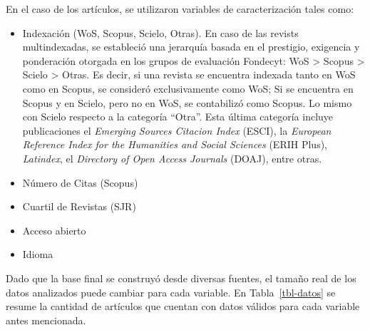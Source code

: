 \documentclass[
  a4paper,
  oneside]{scrbook}
\begin{document}
En el caso de los artículos, se utilizaron variables de caracterización
tales como:

\begin{itemize}
\item
  Indexación (WoS, Scopus, Scielo, Otras). En caso de las revists
  multindexadas, se estableció una jerarquía basada en el prestigio,
  exigencia y ponderación otorgada en los grupos de evaluación Fondecyt:
  WoS \textgreater{} Scopus \textgreater{} Scielo \textgreater{} Otras.
  Es decir, si una revista se encuentra indexada tanto en WoS como en
  Scopus, se consideró exclusivamente como WoS; Si se encuentra en
  Scopus y en Scielo, pero no en WoS, se contabilizó como Scopus. Lo
  mismo con Scielo respecto a la categoría ``Otra''. Esta última
  categoría incluye publicaciones el \emph{Emerging Sources Citacion
  Index} (ESCI), la \emph{European Reference Index for the Humanities
  and Social Sciences} (ERIH Plus), \emph{Latindex}, el \emph{Directory
  of Open Access Journals} (DOAJ), entre otras.
\item
  Número de Citas (Scopus)
\item
  Cuartil de Revistas (SJR)
\item
  Acceso abierto
\item
  Idioma
\end{itemize}

Dado que la base final se construyó desde diversas fuentes, el tamaño
real de los datos analizados puede cambiar para cada variable. En
Tabla~\ref{tbl-datos} se resume la cantidad de artículos que cuentan con
datos válidos para cada variable antes mencionada.

\begin{table}

\caption{\label{tbl-datos}N analítico por variable de análisis}


\end{table}%
\end{document}
